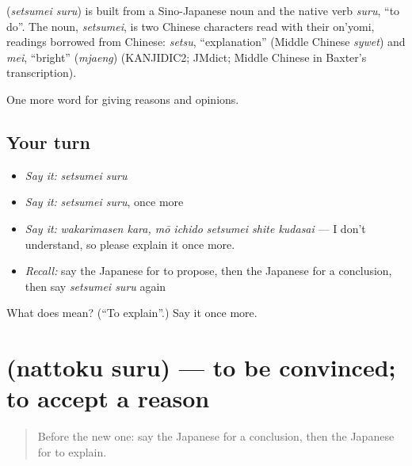 \begin{cousinweb}
\textbf{} (\emph{setsumei suru}) is built from a Sino-Japanese noun and the native verb \emph{suru}, \textquotedblleft{}to do\textquotedblright{}. The noun, \emph{setsumei}, is two Chinese characters read with their on'yomi, readings borrowed from Chinese: \emph{setsu}, \textquotedblleft{}explanation\textquotedblright{} (Middle Chinese \emph{sywet}) and \emph{mei}, \textquotedblleft{}bright\textquotedblright{} (\emph{mjaeng}) (KANJIDIC2; JMdict; Middle Chinese in Baxter's transcription).
\end{cousinweb}

\begin{grammarlens}[title={What you've built}]
One more word for giving reasons and opinions.
\end{grammarlens}

\subsection*{Your turn}
\begin{itemize}
\raggedright
  \item \emph{Say it:} \emph{setsumei suru}
  \item \emph{Say it:} \emph{setsumei suru}, once more
  \item \emph{Say it:} \emph{wakarimasen kara, mō ichido setsumei shite kudasai} — I don't understand, so please explain it once more.
  \item \emph{Recall:} say the Japanese for to propose, then the Japanese for a conclusion, then say \emph{setsumei suru} again
\end{itemize}

\begin{tcolorbox}[breakable,colback=teal!4,colframe=teal!35!black,title={Before you move on}]
What does  mean? (\textquotedblleft{}To explain\textquotedblright{}.) Say it once more.
\end{tcolorbox}
\section[\texorpdfstring{\ja{なっとくする} (nattoku suru)}{なっとくする (nattoku suru)}]{ (nattoku suru) — to be convinced; to accept a reason}

\label{lesson:JA-C318-nattoku-suru}



\begin{quote}
Before the new one: say the Japanese for a conclusion, then the Japanese for to explain.
\end{quote}


